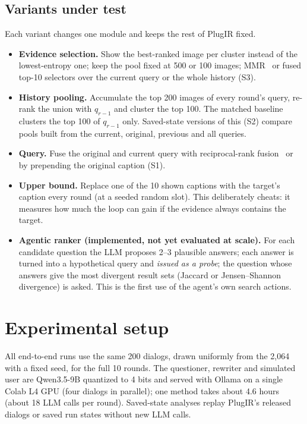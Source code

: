 \documentclass[sigconf,nonacm]{acmart}
\begin{document}
\subsection{Variants under test}
Each variant changes one module and keeps the rest of PlugIR fixed.
\begin{itemize}
\item \textbf{Evidence selection.} Show the best-ranked image per cluster instead of the
  lowest-entropy one; keep the pool fixed at 500 or 100 images; MMR~\cite{carbonell1998mmr} or
  fused top-10 selectors over the current query or the whole history (S3).
\item \textbf{History pooling.} Accumulate the top 200 images of every round's query,
  re-rank the union with $q_{r-1}$ and cluster the top 100. The matched baseline clusters the top
  100 of $q_{r-1}$ only. Saved-state versions of this (S2) compare pools built from the current,
  original, previous and all queries.
\item \textbf{Query.} Fuse the original and current query with reciprocal-rank
  fusion~\cite{cormack2009rrf} or by prepending the original caption (S1).
\item \textbf{Upper bound.} Replace one of the 10 shown captions with the target's caption every
  round (at a seeded random slot). This deliberately cheats: it measures how much the loop can
  gain if the evidence always contains the target.
\item \textbf{Agentic ranker (implemented, not yet evaluated at scale).} For each candidate
  question the LLM proposes 2--3 plausible answers; each answer is turned into a hypothetical
  query and \emph{issued as a probe}; the question whose answers give the most divergent result
  sets (Jaccard or Jensen--Shannon divergence) is asked. This is the first use of the agent's own
  search actions.
\end{itemize}

\section{Experimental setup}
All end-to-end runs use the same 200 dialogs, drawn uniformly from the 2{,}064 with a fixed seed,
for the full 10 rounds. The questioner, rewriter and simulated user are Qwen3.5-9B quantized to
4 bits and served with Ollama on a single Colab L4 GPU (four dialogs in parallel); one method takes
about 4.6 hours (about 18 LLM calls per round). Saved-state analyses replay PlugIR's released
dialogs or saved run states without new LLM calls.
\end{document}
